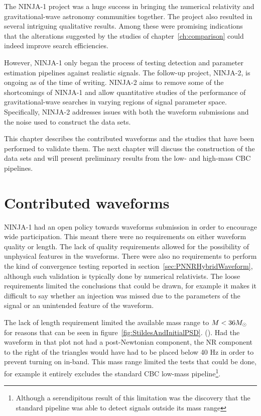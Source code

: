 The NINJA-1 project was a huge success in bringing the numerical
relativity and gravitational-wave astronomy communities together.  The
project also resulted in several intriguing qualitative results.
Among these were promising indications that the alterations suggested 
by the studies of chapter~\ref{ch:comparison} could indeed improve
search efficiencies.

However, NINJA-1 only began the process of testing detection and
parameter estimation pipelines against realistic signals.  The
follow-up project, NINJA-2, is ongoing as of the time of writing.
NINJA-2 aims to remove some of the shortcomings of NINJA-1 and allow
quantitative studies of the performance of gravitational-wave searches
in varying regions of signal parameter space.  Specifically, NINJA-2
addresses issues with both the waveform submissions and the noise used
to construct the data sets.

This chapter describes the contributed waveforms and the studies that
have been performed to validate them.  The next chapter will discuss
the construction of the data sets and will present preliminary results
from the low- and high-mass CBC pipelines.

\section{Contributed waveforms}

NINJA-1 had an open policy towards waveforms submission in order to
encourage wide participation.  This meant there were no requirements
on either waveform quality or length.  The lack of quality
requirements allowed for the possibility of unphysical features in the
waveforms.  There were also no requirements to perform the kind of
convergence testing reported in section~\ref{sec:PNNRHybridWaveform},
although such validation is typically done by numerical
relativists.  The loose requirements limited the conclusions that
could be drawn, for example it makes it difficult to say whether an
injection was missed due to the parameters of the signal or an
unintended feature of the waveform.

The lack of length requirement limited the available mass range to $M
< 36 M_\odot$ for reasons that can be seen in
figure~\ref{fig:StildesAndInitialPSD}.   (). Had the waveform in that plot not had a
post-Newtonian component, the NR component to the right of the
triangles would have had to be placed below 40 Hz in order to prevent
turning on in-band.  This mass range limited the tests that could be
done, for example it entirely excludes the standard CBC low-mass
pipeline\footnote{Although a serendipitous result of this limitation
was the discovery that the standard pipeline was able to detect
signals outside its mass range}.

